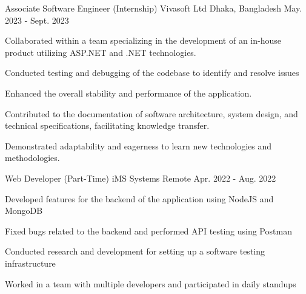 \begin{cventries}
  \cventry
    {Associate Software Engineer (Internship)} %
    {Vivasoft Ltd} %
    {Dhaka, Bangladesh} %
    {May. 2023 - Sept. 2023} %
    {
      \begin{cvitems} %
        \item Collaborated within a team specializing in the development of an in-house product utilizing ASP.NET and .NET technologies.
        \item Conducted testing and debugging of the codebase to identify and resolve issues
        \item Enhanced the overall stability and performance of the application.
        \item Contributed to the documentation of software architecture, system design, and technical specifications, facilitating knowledge transfer.
        \item Demonstrated adaptability and eagerness to learn new technologies and methodologies.
      \end{cvitems}
    }
  \vspace{10pt}
  \cventry
    {Web Developer (Part-Time)} %
    {iMS Systems} %
    {Remote} %
    {Apr. 2022 - Aug. 2022} %
    {
      \begin{cvitems} %
        \item {Developed features for the backend of the application using NodeJS and MongoDB}
        \item {Fixed bugs related to the backend and performed API testing using Postman}
        \item {Conducted research and development for setting up a software testing infrastructure}
        \item {Worked in a team with multiple developers and participated in daily standups}
      \end{cvitems}
    }

\end{cventries}
